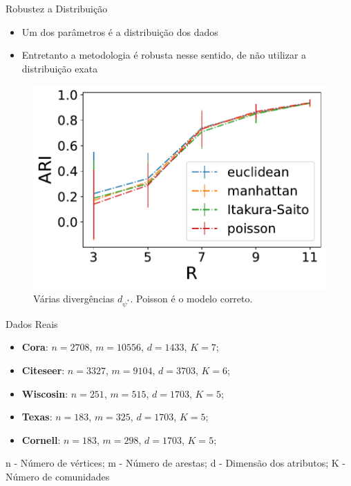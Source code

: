 \documentclass[aspectratio=169]{beamer}
\begin{document}
\begin{frame}{Robustez a Distribuição}

\begin{itemize}
	\item Um dos parâmetros é a distribuição dos dados
	\item Entretanto a metodologia é robusta nesse sentido, de não utilizar a distribuição exata
\end{itemize}
\begin{figure}
	\centering
	\includegraphics[scale=0.35]{img/varyingAttributeDivergence_netGaussian_attPoisson_N_200_K_2_pin_0,04_pout_0,01_muin_2_muout_0_nu2_3_nAverage_20.pdf}
	\caption{Várias divergências $d_{\psi^*}$. Poisson é o modelo correto.}
\end{figure}
\end{frame}


\begin{frame}{Dados Reais}
\begin{itemize}
 \item \textbf{Cora}: $n=2708$, $m = 10556$, $d = 1433$, $K = 7$;
 \item \textbf{Citeseer}: $n = 3327$, $m = 9104$, $d = 3703$, $K=6 $; 
 \item \textbf{Wiscosin}: $n=251$, $m=515$, $d=1703$, $K=5$;
 \item \textbf{Texas}: $n=183$, $m=325$, $d=1703$, $K=5$;
 \item \textbf{Cornell}: $n=183$, $m=298$, $d=1703$, $K=5$;
\end{itemize}
n - Número de vértices;
m - Número de arestas;
d - Dimensão dos atributos;
K - Número de comunidades
\end{frame}
\end{document}
